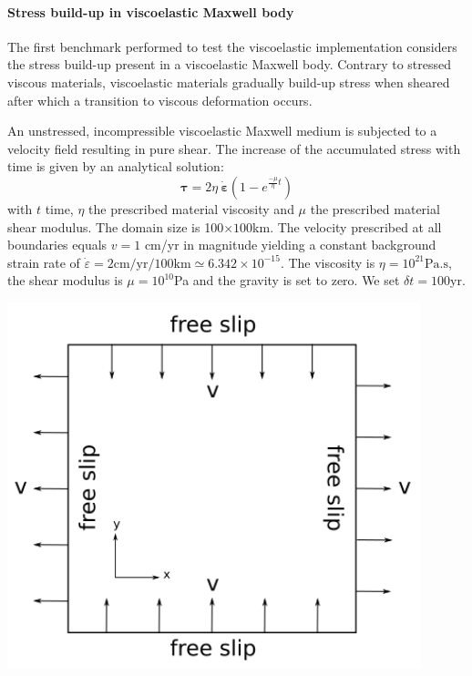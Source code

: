 
\paragraph{Stress build-up in viscoelastic Maxwell body}

The first benchmark performed to test the viscoelastic implementation considers the stress 
build-up present in a viscoelastic Maxwell body. Contrary to stressed viscous materials, 
viscoelastic materials gradually build-up stress when sheared after which a transition to viscous deformation occurs.  

An unstressed, incompressible viscoelastic Maxwell medium is subjected to a velocity field 
resulting in pure shear. 
The increase of the accumulated stress with time is given by an analytical solution:
\begin{equation}
{\bm \tau} = 2\eta\ {\dot{\bm \varepsilon}} \left ( 1-e^{\frac{-\mu }{\eta} t } \right )
\end{equation}
with $t$ time, $\eta$ the prescribed material viscosity and $\mu$ the prescribed material shear modulus. 
The domain size is 100$\times 100$km.
The velocity prescribed at all boundaries equals $v=1$ cm/yr in magnitude yielding a constant 
background strain rate of $\dot{\varepsilon}=2\text{cm/yr}/100\text{km}\simeq 6.342\times 10^{-15}$. 
The viscosity is $\eta= 10^{21}\text{Pa.s}$, the shear modulus is 
$\mu =10^{10}$Pa and the gravity is set to zero. We set $\delta t=100$yr.  

\begin{center}
\includegraphics[width=0.9\textwidth]{python_codes/fieldstone_64/images/stress_buildup_setup.png}\\
\end{center}

